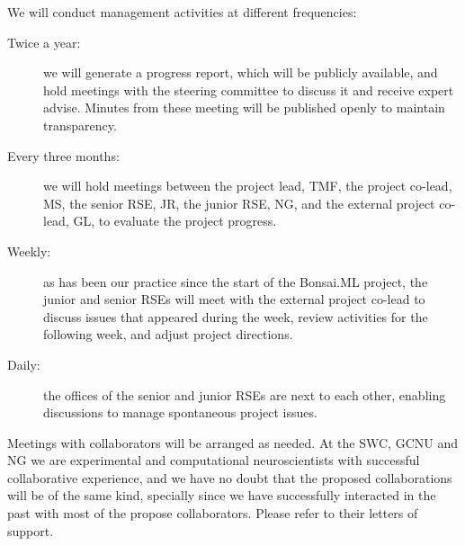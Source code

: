 We will conduct management activities at different frequencies:

\begin{description}

    \item[Twice a year:] we will generate a progress report, which will be
        publicly available, and hold meetings with the steering committee to
        discuss it and receive expert advise. Minutes from these meeting will
        be published openly to maintain transparency.

    \item[Every three months:] we will hold meetings between the project lead, TMF, the
        project co-lead, MS, the senior RSE, JR, the junior RSE, NG, and
        the external project co-lead, GL, to evaluate the project progress.

    \item[Weekly:] as has been our practice since the start of the Bonsai.ML
        project, the junior and senior RSEs will meet with the external project
        co-lead to discuss issues that appeared during the week, review
        activities for the following week, and adjust project directions.

    \item[Daily:] the offices of the senior and junior RSEs are next to each
        other, enabling discussions to manage spontaneous project issues.

\end{description}

Meetings with collaborators will be arranged as needed.
%
At the SWC, GCNU and NG we are experimental and computational neuroscientists
with successful collaborative experience, and we have no doubt that the
proposed collaborations will be of the same kind,
%
specially since we have successfully interacted in the past with most of the
propose collaborators.
%
Please refer to their letters of support.
